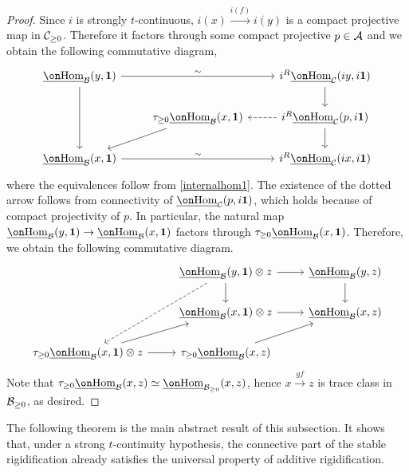 \documentclass[a4paper,10pt, oneside]{amsart}
\begin{document}
	\begin{proof}
		Since $i$ is strongly $t$-continuous, $i(x)\xrightarrow{i(f)}i(y)$ is a compact projective map in $\mathcal{C}_{\geq 0}$. Therefore it factors through some compact projective $p\in \mathcal{A}$ and we obtain the following commutative diagram,
		$$\begin{tikzcd}
			{\underline{\Hom}_{\mcb}(y,\mb{1})} \arrow[rr, "\sim"] \arrow[dd] &                                                       & {i^R\underline{\Hom}_{\mcc}(iy,i\mb{1})} \arrow[d]                  \\
			& {\tau_{\geq0}\underline{\Hom}_{\mcb}(x,\mb{1})} \arrow[ld] & {i^R\underline{\Hom}_{\mcc}(p,i\mb{1})} \arrow[d] \arrow[l, dashed] \\
			{\underline{\Hom}_{\mcb}(x,\mb{1})} \arrow[rr, "\sim"]            &                                                       & {i^R\underline{\Hom}_{\mcc}(ix,i\mb{1})}                           
		\end{tikzcd}$$
		where the equivalences follow from \cref{internalhom1}. The existence of the dotted arrow follows from connectivity of $\underline{\Hom}_{\mcc}(p,i\mb{1})$, which holds because of compact projectivity 
		of $p$. 
		In particular, the natural map $\underline{\Hom}_{\mcb}(y,\mb{1})\to \underline{\Hom}_{\mcb}(x,\mb{1})$ factors through $\tau_{\geq0}\underline{\Hom}_{\mcb}(x,\mb{1})$.
		Therefore, we obtain the following commutative diagram.
		$$\begin{tikzcd}
			& {\underline{\Hom}_{\mcb}(y,\mb{1})\otimes z} \arrow[d] \arrow[ldd, dashed] \arrow[r] & {\underline{\Hom}_{\mcb}(y,z)} \arrow[d] \\
			& {\underline{\Hom}_{\mcb}(x,\mb{1})\otimes z} \arrow[r]                               & {\underline{\Hom}_{\mcb}(x,z)}           \\
			{\tau_{\geq0}\underline{\Hom}_{\mcb}(x,\mb{1})\otimes z} \arrow[ru] \arrow[r] & {\tau_{\geq0}\underline{\Hom}_{\mcb}(x,z)} \arrow[ru]                                &                                         
		\end{tikzcd}$$
		Note that $\tau_{\geq0}\underline{\Hom}_{\mcb}(x,z)\simeq \underline{\Hom}_{\mcb_{\geq 0}}(x,z)$, hence $x\xrightarrow{gf} z $ is trace class in $\mathcal{B}_{\geq 0}$, as desired.
	\end{proof}
	The following theorem is the main abstract result of this subsection. It shows that, under a strong \(t\)-continuity hypothesis, the connective part of the stable rigidification already satisfies the universal property of additive rigidification.
\end{document}
